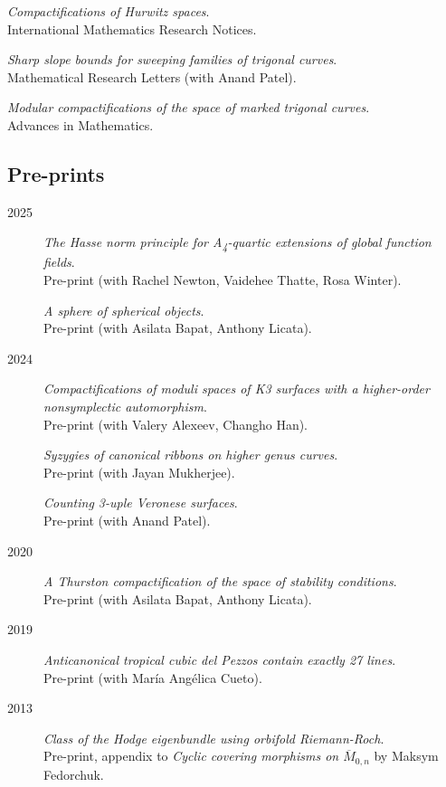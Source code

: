 \documentclass[11pt]{article}
\begin{document}
\begin{description}
\emph{Compactifications of Hurwitz spaces}.\\
International Mathematics Research Notices.
\item[{2013}] \emph{Sharp slope bounds for sweeping families of trigonal curves}.\\
Mathematical Research Letters (with Anand Patel).

\emph{Modular compactifications of the space of marked trigonal curves}.\\
Advances in Mathematics.
\end{description}
\subsection*{Pre-prints}
\label{sec:orge35464c}
\label{org2e431b3}
\begin{description}
\item[{2025}] \emph{The Hasse norm principle for A\textsubscript{4}-quartic extensions of global function fields}.\\
Pre-print (with Rachel Newton, Vaidehee Thatte, Rosa Winter).

\emph{A sphere of spherical objects}.\\
Pre-print (with Asilata Bapat, Anthony Licata).
\item[{2024}] \emph{Compactifications of moduli spaces of K3 surfaces with a higher-order nonsymplectic automorphism}.\\
Pre-print (with Valery Alexeev, Changho Han).

\emph{Syzygies of canonical ribbons on higher genus curves}.\\
Pre-print (with Jayan Mukherjee).

\emph{Counting 3-uple Veronese surfaces}.\\
Pre-print (with Anand Patel).
\item[{2020}] \emph{A Thurston compactification of the space of stability conditions}.\\
Pre-print (with Asilata Bapat, Anthony Licata).
\item[{2019}] \emph{Anticanonical tropical cubic del Pezzos contain exactly 27 lines}.\\
Pre-print (with María Angélica Cueto).
\item[{2013}] \emph{Class of the Hodge eigenbundle using orbifold Riemann-Roch}.\\
Pre-print, appendix to \emph{Cyclic covering morphisms on \(\overline M_{0,n}\)} by Maksym Fedorchuk.
\end{description}
\end{document}
